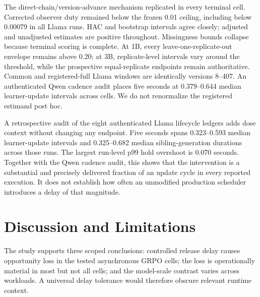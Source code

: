 \documentclass{article}
\begin{document}
The direct-chain/version-advance mechanism replicated in every terminal cell. Corrected observer duty remained below the frozen 0.01 ceiling, including below 0.00079 in all Llama runs. HAC and bootstrap intervals agree closely; adjusted and unadjusted estimates are positive throughout. Missingness bounds collapse because terminal scoring is complete. At 1B, every leave-one-replicate-out envelope remains above 0.20; at 3B, replicate-level intervals vary around the threshold, while the prospective equal-replicate endpoints remain authoritative. Common and registered-full Llama windows are identically versions 8--407. An authenticated Qwen cadence audit places five seconds at 0.379--0.644 median learner-update intervals across cells. We do not renormalize the registered estimand post hoc.

A retrospective audit of the eight authenticated Llama lifecycle ledgers adds dose context without changing any endpoint. Five seconds spans 0.323--0.593 median learner-update intervals and 0.325--0.682 median sibling-generation durations across those runs. The largest run-level p99 hold overshoot is 0.070 seconds. Together with the Qwen cadence audit, this shows that the intervention is a substantial and precisely delivered fraction of an update cycle in every reported execution. It does not establish how often an unmodified production scheduler introduces a delay of that magnitude.

\section{Discussion and Limitations}
The study supports three scoped conclusions: controlled release delay causes opportunity loss in the tested asynchronous GRPO cells; the loss is operationally material in most but not all cells; and the model-scale contrast varies across workloads. A universal delay tolerance would therefore obscure relevant runtime context.
\end{document}
